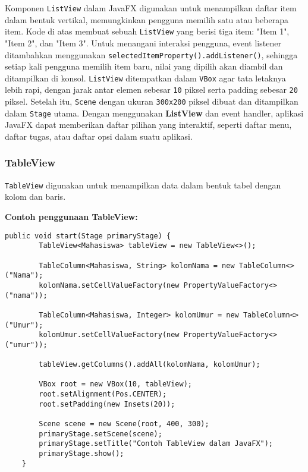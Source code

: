 Komponen \texttt{ListView} dalam JavaFX digunakan untuk menampilkan daftar item dalam bentuk vertikal, memungkinkan pengguna memilih satu atau beberapa item. Kode di atas membuat sebuah \texttt{ListView} yang berisi tiga item: "Item 1", "Item 2", dan "Item 3". Untuk menangani interaksi pengguna, event listener ditambahkan menggunakan \texttt{selectedItemProperty().addListener()}, sehingga setiap kali pengguna memilih item baru, nilai yang dipilih akan diambil dan ditampilkan di konsol. \texttt{ListView} ditempatkan dalam \texttt{VBox} agar tata letaknya lebih rapi, dengan jarak antar elemen sebesar \texttt{10} piksel serta padding sebesar \texttt{20} piksel. Setelah itu, \texttt{Scene} dengan ukuran \texttt{300x200} piksel dibuat dan ditampilkan dalam \texttt{Stage} utama. Dengan menggunakan \textbf{ListView} dan event handler, aplikasi JavaFX dapat memberikan daftar pilihan yang interaktif, seperti daftar menu, daftar tugas, atau daftar opsi dalam suatu aplikasi.



\subsubsection{TableView}

\texttt{TableView} digunakan untuk menampilkan data dalam bentuk tabel dengan kolom dan baris.

\textbf{Contoh penggunaan TableView:}
\begin{lstlisting}[style=JavaStyle, caption=Membuat TableView dalam JavaFX]
	public void start(Stage primaryStage) {
		TableView<Mahasiswa> tableView = new TableView<>();
		
		TableColumn<Mahasiswa, String> kolomNama = new TableColumn<>("Nama");
		kolomNama.setCellValueFactory(new PropertyValueFactory<>("nama"));
		
		TableColumn<Mahasiswa, Integer> kolomUmur = new TableColumn<>("Umur");
		kolomUmur.setCellValueFactory(new PropertyValueFactory<>("umur"));
		
		tableView.getColumns().addAll(kolomNama, kolomUmur);
		
		VBox root = new VBox(10, tableView);
		root.setAlignment(Pos.CENTER);
		root.setPadding(new Insets(20));
		
		Scene scene = new Scene(root, 400, 300);
		primaryStage.setScene(scene);
		primaryStage.setTitle("Contoh TableView dalam JavaFX");
		primaryStage.show();
	}
\end{lstlisting}

